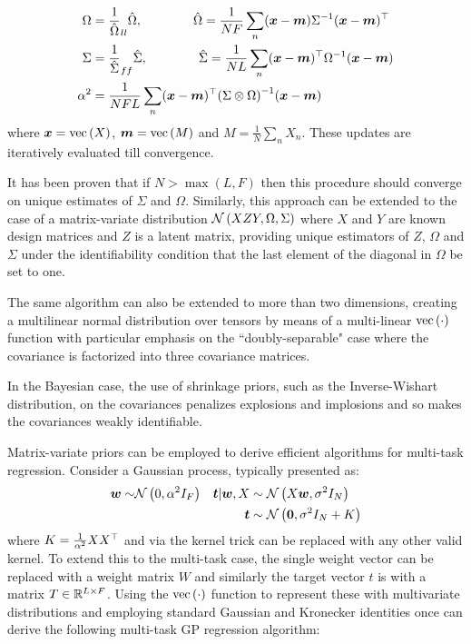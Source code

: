 \begin{align}
\Omega & = \frac{1}{\hat{\Omega}}_{ll} \hat{\Omega}, \qquad\qquad\hat{\Omega} = \frac{1}{N F} \sum_n (\bm x - \bm m) {\Sigma}^{-1} (\bm x - \bm m)^\top \\
\Sigma & = \frac{1}{\hat{\Sigma}}_{ff} \hat{\Sigma}, \qquad\qquad\hat{\Sigma} = \frac{1}{N L} \sum_n (\bm x - \bm m)^\top {\Omega}^{-1} (\bm x - \bm m) \\
\alpha^2 & = \frac{1}{NFL} \sum_n (\bm x - \bm m)^\top{\left( \Sigma \otimes \Omega \right)}^{-1}(\bm x - \bm m)
\end{align}
where $\bm x = \text{vec}\left(X\right)$, $\bm m = \text{vec}\left(M\right)$ and $M=\frac{1}{N} \sum_n X_n$. These updates are iteratively evaluated till convergence.

It has been proven that if $N > \max(L, F)$ then this procedure should converge on unique estimates of $\Sigma$ and $\Omega$\cite{Srivastava2009}. Similarly, this approach can be extended\cite{Srivastava2009a} to the case of a matrix-variate distribution $\mathcal{N} \left(XZY, \Omega, \Sigma\right)$ where $X$ and $Y$ are known design matrices and $Z$ is a latent matrix, providing unique estimators of $Z$, $\Omega$ and $\Sigma$ under the identifiability condition that the last element of the diagonal in $\Omega$ be set to one.


The same algorithm can also be extended to more than two dimensions\cite{Ohlson2011}\cite{Ohlson2013}, creating a multilinear normal distribution over tensors by means of a multi-linear $\text{vec}\left(\cdot\right)$ function with particular emphasis on the ``doubly-separable" case where the covariance is factorized into three covariance matrices.

In the Bayesian case, the use of shrinkage priors, such as the Inverse-Wishart distribution, on the covariances penalizes explosions and implosions\cite{Archambeau2011} and so makes the covariances weakly identifiable.

Matrix-variate priors can be employed to derive efficient algorithms for multi-task regression. Consider a Gaussian process, typically\cite{Bishop2006} presented as:
\begin{align}
\bm w \sim & \mathcal{N} \left( {0}, {\alpha^2 I_F} \right) & \bm t|\bm w,X & \sim \mathcal{N} \left( {X\bm w}, {\sigma^2 I_N} \right) \\
& & \bm t & \sim \mathcal{N} \left( {\bm 0}, {\sigma^2I_N + K} \right)
\end{align}
where $K = \frac{1}{\alpha^2} X X^\top$ and via the kernel trick\cite{Jst2004} can be replaced with any other valid kernel. To extend this to the multi-task case, the single weight vector can be replaced with a weight matrix $W$ and similarly the target vector $t$ is with a matrix $T \in { \mathbb{R}^{L \times F} }$. Using the $\text{vec}\left(\cdot\right)$ function to represent these with multivariate distributions and employing standard Gaussian\cite{Bishop2006} and Kronecker\cite{Minka2000a} identities once can derive the following multi-task GP regression algorithm\cite{Bonilla2008}:

